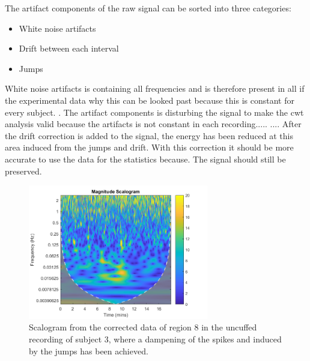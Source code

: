 The artifact components of the raw signal can be sorted into three categories: 
\begin{itemize}
	\item White noise artifacts
    \item Drift between each interval
	\item Jumps
\end{itemize}

White noise artifacts is containing all frequencies and is therefore present in all if the experimental data why this can be looked past because this is constant for every subject. . The artifact components is disturbing the signal to make the cwt analysis valid because the artifacts is not constant in each recording.....
....
After the drift correction is added to the signal, the energy  has been reduced at this area induced from the jumps and drift. With this correction it should be more accurate to use the data for the statistics because. The signal should still be  preserved. 

\begin{figure}[H]
	\includegraphics[width=0.7\textwidth]{figures/uncuffed_sub3_roi8_corr}
	\caption{Scalogram from the corrected data of region 8 in the uncuffed recording of subject 3, where a dampening of the spikes and  induced by the jumps has been achieved.}
	\label{fig:scalogram_corr}
\end{figure} 